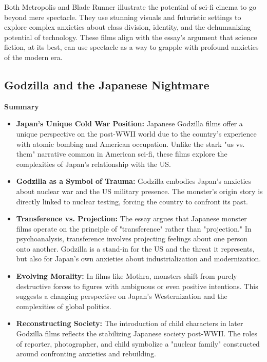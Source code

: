 \documentclass[11pt,fleqn]{book}
\begin{document}
\vspace{5pt}

Both Metropolis and Blade Runner illustrate the potential of sci-fi cinema to go beyond mere spectacle. They use stunning visuals and futuristic settings to explore complex anxieties about class division, identity, and the dehumanizing potential of technology. These films align with the essay's argument that science fiction, at its best, can use spectacle as a way to grapple with profound anxieties of the modern era.

\subsection{Godzilla and the Japanese Nightmare}
\textbf{Summary}

\begin{itemize}
\item \textbf{Japan's Unique Cold War Position:} Japanese Godzilla films offer a unique perspective on the post-WWII world due to the country's experience with atomic bombing and American occupation. Unlike the stark "us vs. them" narrative common in American sci-fi, these films explore the complexities of Japan's relationship with the US.

\item \textbf{Godzilla as a Symbol of Trauma:} Godzilla embodies Japan's anxieties about nuclear war and the US military presence. The monster's origin story is directly linked to nuclear testing, forcing the country to confront its past.

\item \textbf{Transference vs. Projection:} The essay argues that Japanese monster films operate on the principle of "transference" rather than "projection." In psychoanalysis, transference involves projecting feelings about one person onto another. Godzilla is a stand-in for the US and the threat it represents, but also for Japan's own anxieties about industrialization and modernization.

\item \textbf{Evolving Morality:} In films like Mothra, monsters shift from purely destructive forces to figures with ambiguous or even positive intentions. This suggests a changing perspective on Japan's Westernization and the complexities of global politics.

\item \textbf{Reconstructing Society:} The introduction of child characters in later Godzilla films reflects the stabilizing Japanese society post-WWII. The roles of reporter, photographer, and child symbolize a "nuclear family" constructed around confronting anxieties and rebuilding.


\end{itemize}
\end{document}
